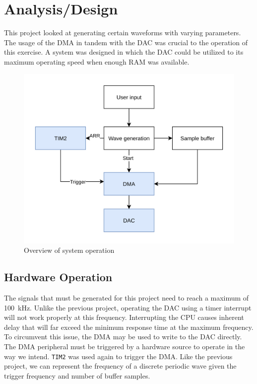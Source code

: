 \documentclass[CMPE]{KGCOEReport}
\def\code#1{\texttt{#1}}
\begin{document}
    \maketitle
    \section*{Analysis/Design}

    This project looked at generating certain waveforms with varying parameters.
    The usage of the DMA in tandem with the DAC was crucial to the operation of
    this exercise. A system was designed in which the DAC could be utilized to
    its maximum operating speed when enough RAM was available.

	\begin{figure}[h!]
      \centering
      \includegraphics[width=12cm]{overview}
      \caption{Overview of system operation}
      \label{fig:overview}
    \end{figure}

	

	\subsection*{Hardware Operation}

	The signals that must be generated for this project need to reach a maximum
	of \SI{100}{\kilo\Hz}. Unlike the previous project, operating the DAC using
	a timer interrupt will not work properly at this frequency. Interrupting the
	CPU causes inherent delay that will far exceed the minimum response time at
	the maximum frequency. To circumvent this issue, the DMA may be used to write
	to the DAC directly. The DMA peripheral must be triggered by a hardware source
	to operate in the way we intend. \code{TIM2} was used again to trigger the DMA.
	Like the previous project, we can represent the frequency of a discrete periodic
	wave given the trigger frequency and number of buffer samples.
\end{document}
